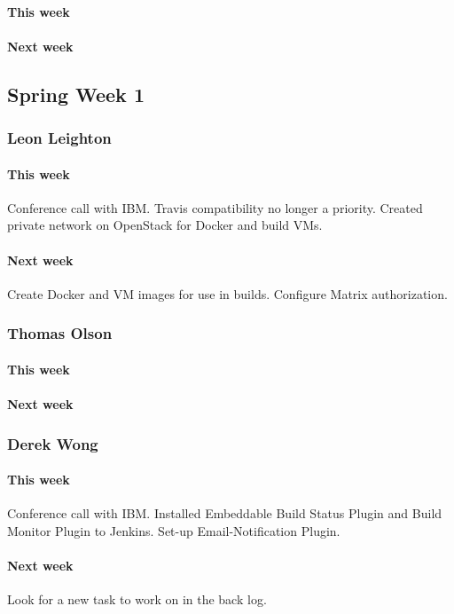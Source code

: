 \documentclass[10pt,letterpaper,onecolumn,draftclsnofoot]{IEEEtran}
\begin{document}
\paragraph{This week}
\paragraph{Next week}



\subsection{Spring Week 1}
\subsubsection{Leon Leighton}
\paragraph{This week}Conference call with IBM. Travis compatibility no longer a priority.
Created private network on OpenStack for Docker and build VMs.
\paragraph{Next week}Create Docker and VM images for use in builds.
Configure Matrix authorization.

\subsubsection{Thomas Olson}
\paragraph{This week}
\paragraph{Next week}

\subsubsection{Derek Wong}
\paragraph{This week}Conference call with IBM.     
Installed Embeddable Build Status Plugin and Build Monitor Plugin to Jenkins.   
Set-up Email-Notification Plugin.
\paragraph{Next week}Look for a new task to work on in the back log.
\end{document}
